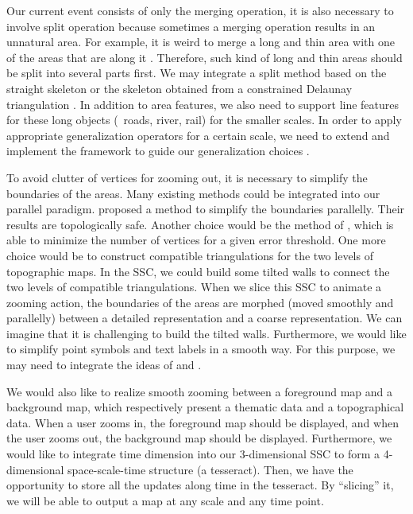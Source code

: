 \documentclass[]{interact}
\begin{document}
Our current event consists of only the merging operation,
it is also necessary to involve split operation
because sometimes a merging operation results in an unnatural area.
For example, it is weird to merge a long and thin area 
with one of the areas that are along it
\citep[see][]{Haunert2008Skeleton}.
Therefore, such kind of long and thin areas should be
split into several parts first.
We may integrate a split method based on the straight skeleton
\citep{Haunert2008Skeleton}
or the skeleton obtained from a constrained Delaunay triangulation
\citep{Meijers2016Split}.
In addition to area features, we also need to support line features 
for these long objects (\eg~roads, river, rail) for the smaller scales.
In order to apply appropriate generalization operators
for a certain scale,
we need to extend and implement the framework 
to guide our generalization choices
\citep{Meijers2018Framework}.


To avoid clutter of vertices for zooming out, 
it is necessary to simplify the boundaries of the areas.
Many existing methods could be integrated into our parallel paradigm.
\citet{Meijers2011LineSimp} proposed a method 
to simplify the boundaries parallelly. 
Their results are topologically safe. 
Another choice would be the method of \citet{ImaiIri1988},
which is able to minimize the number of vertices 
for a given error threshold.
One more choice would be to construct compatible triangulations 
\citep[see][]{Peng2019Thesis}
for the two levels of topographic maps.
In the SSC, we could build some tilted walls 
to connect the two levels of compatible triangulations.
When we slice this SSC to animate a zooming action,
the boundaries of the areas are morphed 
(moved smoothly and parallelly)
between a detailed representation and a coarse representation.
We can imagine that it is challenging to build the tilted walls.
Furthermore, we would like to 
simplify point symbols and text labels in a smooth way.
For this purpose, we may need to integrate the ideas of
\citet{Haunert2017Label} and \citet{sahw-oarps-ICAGW13}.

We would also like to realize smooth zooming
between a foreground map and a background map,
which respectively present a thematic data and a topographical data.
When a user zooms in, the foreground map should be displayed,
and when the user zooms out,
the background map should be displayed.
Furthermore, we would like to 
integrate time dimension into our 3-dimensional SSC
to form a 4-dimensional space-scale-time structure (a tesseract).
Then, we have the opportunity to store all the updates along time in the tesseract.
By ``slicing'' it, we will be able to output a map at any scale and any time point.
\end{document}
